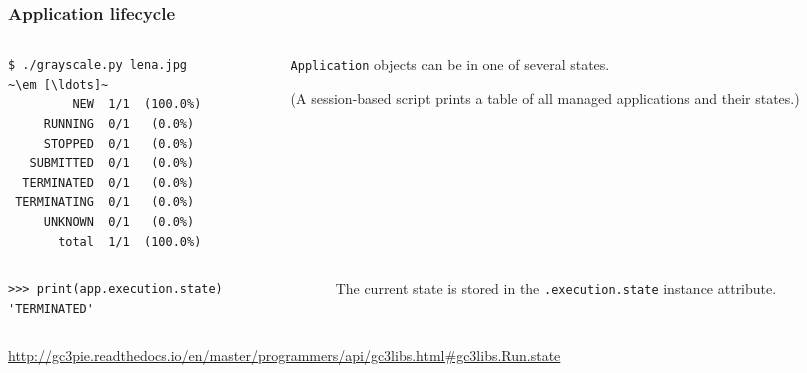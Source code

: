 \documentclass[english,serif,mathserif,xcolor=pdftex,dvipsnames,table]{beamer}
\begin{document}
\begin{frame}[fragile]
\frametitle{Application lifecycle}

\begin{columns}[c]
  \begin{column}{0.5\textwidth}
\begin{lstlisting}[basicstyle=\footnotesize\ttfamily,keywordstyle=\normalfont]
$ ./grayscale.py lena.jpg
~\em [\ldots]~
         NEW  1/1  (100.0%)
     RUNNING  0/1   (0.0%)
     STOPPED  0/1   (0.0%)
   SUBMITTED  0/1   (0.0%)
  TERMINATED  0/1   (0.0%)
 TERMINATING  0/1   (0.0%)
     UNKNOWN  0/1   (0.0%)
       total  1/1  (100.0%)
\end{lstlisting}%
  \end{column}
  \begin{column}{0.5\textwidth}
    \raggedleft
    \texttt{Application} objects can be in one of several states.

    \+
    (A session-based script prints a table of all managed applications and their states.)
  \end{column}
\end{columns}

\+
\begin{columns}[c]
  \begin{column}{0.5\textwidth}
\begin{lstlisting}[basicstyle=\footnotesize\ttfamily]
>>> print(app.execution.state)
'TERMINATED'
\end{lstlisting}
  \end{column}
  \begin{column}{0.5\textwidth}
    \raggedleft
    The current state is stored in the \texttt{.execution.state} instance attribute.
  \end{column}
\end{columns}

\+
\begin{references}
  \tiny
  \url{http://gc3pie.readthedocs.io/en/master/programmers/api/gc3libs.html#gc3libs.Run.state}
\end{references}
\end{frame}
\end{document}
